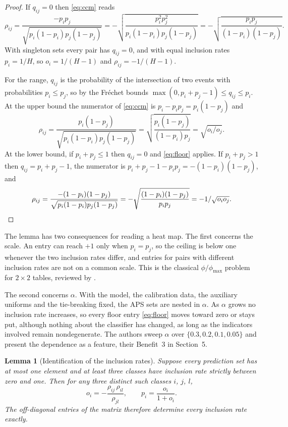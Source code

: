 \documentclass[11pt]{article}
\newtheorem{lemma}{Lemma}
\theoremstyle{definition}
\theoremstyle{definition}
\theoremstyle{remark}
\newcommand{\set}[1]{\{#1\}}
\begin{document}
\begin{proof}
If $q_{ij} = 0$ then \eqref{eq:ccm} reads
\[
\rho_{ij} = \frac{-p_i p_j}{\sqrt{p_i(1-p_i)p_j(1-p_j)}}
          = -\sqrt{\frac{p_i^2 p_j^2}{p_i(1-p_i)p_j(1-p_j)}}
          = -\sqrt{\frac{p_i p_j}{(1-p_i)(1-p_j)}} .
\]
With singleton sets every pair has $q_{ij} = 0$, and with equal inclusion rates $p_i = 1/H$, so
$o_i = 1/(H-1)$ and $\rho_{ij} = -1/(H-1)$.

For the range, $q_{ij}$ is the probability of the intersection of two events with probabilities $p_i
\le p_j$, so by the Fr\'echet bounds \citep{frechet1951} $\max(0, p_i + p_j - 1) \le q_{ij} \le p_i$. At the upper bound
the numerator of \eqref{eq:ccm} is $p_i - p_i p_j = p_i(1-p_j)$ and
\[
\rho_{ij} = \frac{p_i(1-p_j)}{\sqrt{p_i(1-p_i)p_j(1-p_j)}} = \sqrt{\frac{p_i(1-p_j)}{(1-p_i)p_j}} = \sqrt{o_i/o_j} .
\]
At the lower bound, if $p_i + p_j \le 1$ then $q_{ij} = 0$ and \eqref{eq:floor} applies. If
$p_i + p_j > 1$ then $q_{ij} = p_i + p_j - 1$, the numerator is $p_i + p_j - 1 - p_i p_j =
-(1-p_i)(1-p_j)$, and
\[
\rho_{ij} = \frac{-(1-p_i)(1-p_j)}{\sqrt{p_i(1-p_i)p_j(1-p_j)}} = -\sqrt{\frac{(1-p_i)(1-p_j)}{p_i p_j}} = -1/\sqrt{o_i o_j} . \qedhere
\]
\end{proof}

The lemma has two consequences for reading a heat map. The first concerns the scale. An entry can reach $+1$ only when $p_i = p_j$, so the ceiling is below one whenever the two inclusion
rates differ, and entries for pairs with different inclusion rates are not on a common scale. This
is the classical $\phi/\phi_{\max}$ problem for $2 \times 2$ tables, reviewed by
\citet{davenport1991}.

The second concerns $\alpha$. With the model, the calibration data, the auxiliary uniforms and the tie-breaking fixed, the APS
sets are nested in $\alpha$. As $\alpha$ grows no inclusion rate increases, so every floor entry
\eqref{eq:floor} moves toward zero or stays put, although nothing about the classifier has changed,
as long as the indicators involved remain nondegenerate. The authors sweep $\alpha$ over $\set{0.3, 0.2, 0.1, 0.05}$ and present the dependence as a feature,
their Benefit~3 in Section~5.

\begin{lemma}[Identification of the inclusion rates]\label{lem:ident}
Suppose every prediction set has at most one element and at least three classes have inclusion rate
strictly between zero and one. Then for any three distinct such classes $i$, $j$, $l$,
\begin{equation}\label{eq:ident}
o_i = -\frac{\rho_{ij}\,\rho_{il}}{\rho_{jl}}, \qquad p_i = \frac{o_i}{1 + o_i} .
\end{equation}
The off-diagonal entries of the matrix therefore determine every inclusion rate exactly.
\end{lemma}
\end{document}
